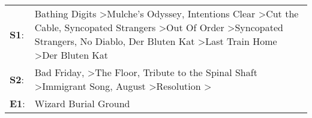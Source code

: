 \begin{supertabular}{p{0.03\textwidth}p{0.92\textwidth}}
 \textbf{S1}:  &  Bathing Digits\textsuperscript{} \textgreater \enspace Mulche's Odyssey\textsuperscript{}, \enspace Intentions Clear\textsuperscript{} \textgreater \enspace Cut the Cable\textsuperscript{}, \enspace Syncopated Strangers\textsuperscript{} \textgreater \enspace Out Of Order\textsuperscript{} \textgreater \enspace Syncopated Strangers\textsuperscript{}, \enspace No Diablo\textsuperscript{}, \enspace Der Bluten Kat\textsuperscript{} \textgreater \enspace Last Train Home\textsuperscript{} \textgreater \enspace Der Bluten Kat\textsuperscript{}  \enspace  \\
 \textbf{S2}:  &                                                                                                                                                                                                Bad Friday\textsuperscript{}, \textsuperscript{} \textgreater \enspace The Floor\textsuperscript{}, \enspace Tribute to the Spinal Shaft\textsuperscript{} \textgreater \enspace Immigrant Song\textsuperscript{}, \enspace August\textsuperscript{} \textgreater \enspace Resolution\textsuperscript{} \textgreater {}\textsuperscript{}  \enspace  \\
 \textbf{E1}:  &                                                                                                                                                                                                                                                                                                                                                                                                                                                                                                                           Wizard Burial Ground\textsuperscript{}  \enspace  \\
\end{supertabular}
